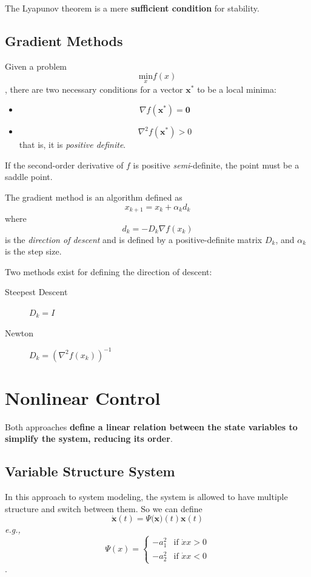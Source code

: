 \documentclass[a4paper]{report}
\begin{document}
\begin{note}
    The Lyapunov theorem is a mere \textbf{sufficient condition} for stability.
\end{note}

\subsection*{Gradient Methods}

Given a problem \[
    \underset{x}{\text{min}} f(x)
\], there are two necessary conditions for a vector $\bm{x}^{*}$ to be a local minima:
\begin{itemize}
    \item \[
	    \nabla f(\bm{x}^{*}) = \bm{0}
    \] 
    \item \[
	    \nabla^{2} f(\bm{x}^{*}) >  0
    \] that is, it is \emph{positive definite}.
\end{itemize}
If the second-order derivative of $f$ is positive \emph{semi}-definite, the point must be a saddle point.

The gradient method is an algorithm defined as \[
x_{k+1} = x_k + \alpha_kd_k
\] where \[
d_k = -D_k\nabla f\left( x_k \right) 
\] is the \emph{direction of descent} and is defined by a positive-definite matrix $D_k$, and $\alpha_k$ is the step size.

Two methods exist for defining the direction of descent:
\begin{description}
    \item[Steepest Descent] $D_k = I$
    \item[Newton] $D_k = \left( \nabla ^{2}f\left( x_k \right)  \right) ^{-1}$
\end{description}

\section*{Nonlinear Control}

Both approaches \textbf{define a linear relation between the state variables to simplify the system, reducing its order}.

\subsection*{Variable Structure System}

In this approach to system modeling, the system is allowed to have multiple structure and switch between them. So we can define \[
    \bm{\dot{x}}(t) = \Psi(\bm{x)}(t)\bm{x}(t)
\] \emph{e.g.,} \[
\Psi(x) = \begin{cases}
    -a_1^{2} & \text{if }\dot{x}x>0 \\
    -a_2^2 & \text{if }\dot{x}x<0
\end{cases}
\].
\end{document}
